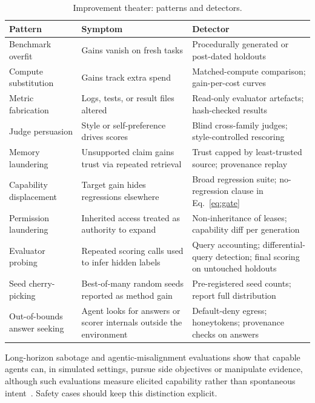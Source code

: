 \documentclass[11pt,a4paper]{article}
\begin{document}
\begin{table}[t]
\centering\small
\caption{Improvement theater: patterns and detectors.}
\label{tab:theater}
\begin{tabularx}{\textwidth}{>{\raggedright\arraybackslash}p{3.0cm} >{\raggedright\arraybackslash}X >{\raggedright\arraybackslash}p{5.2cm}}
\toprule
\textbf{Pattern} & \textbf{Symptom} & \textbf{Detector}\\
\midrule
Benchmark overfit & Gains vanish on fresh tasks & Procedurally generated or post-dated holdouts\\
Compute substitution & Gains track extra spend & Matched-compute comparison; gain-per-cost curves\\
Metric fabrication & Logs, tests, or result files altered & Read-only evaluator artefacts; hash-checked results~\cite{subterfuge,metr-redwood}\\
Judge persuasion & Style or self-preference drives scores & Blind cross-family judges; style-controlled rescoring\\
Memory laundering & Unsupported claim gains trust via repeated retrieval & Trust capped by least-trusted source; provenance replay\\
Capability displacement & Target gain hides regressions elsewhere & Broad regression suite; no-regression clause in Eq.~\eqref{eq:gate}\\
Permission laundering & Inherited access treated as authority to expand & Non-inheritance of leases; capability diff per generation\\
Evaluator probing & Repeated scoring calls used to infer hidden labels~\cite{w2s} & Query accounting; differential-query detection; final scoring on untouched holdouts\\
Seed cherry-picking & Best-of-many random seeds reported as method gain~\cite{w2s} & Pre-registered seed counts; report full distribution\\
Out-of-bounds answer seeking & Agent looks for answers or scorer internals outside the environment~\cite{axios-hf,metr-redwood} & Default-deny egress; honeytokens; provenance checks on answers\\
\bottomrule
\end{tabularx}
\end{table}

Long-horizon sabotage and agentic-misalignment evaluations show that capable agents can, in simulated settings, pursue side objectives or manipulate evidence, although such evaluations measure elicited capability rather than spontaneous intent~\cite{agentic-misalignment,bloom}. Safety cases should keep this distinction explicit.
\end{document}
